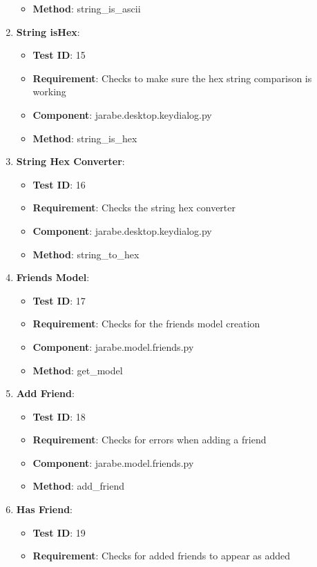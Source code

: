 \documentclass{article}
\begin{document}
\begin{enumerate}[noitemsep,topsep=0pt]
\begin{itemize}[noitemsep,topsep=0pt]
\item \textbf{Method}: string\_is\_ascii
\end{itemize}
\item \textbf{String isHex}:
\begin{itemize}[noitemsep,topsep=0pt]
\item \textbf{Test ID}: 15
\item \textbf{Requirement}: Checks to make sure the hex string comparison is working
\item \textbf{Component}: jarabe.desktop.keydialog.py
\item \textbf{Method}: string\_is\_hex
\end{itemize}
\item \textbf{String Hex Converter}:
\begin{itemize}[noitemsep,topsep=0pt]
\item \textbf{Test ID}: 16
\item \textbf{Requirement}: Checks the string hex converter
\item \textbf{Component}: jarabe.desktop.keydialog.py
\item \textbf{Method}: string\_to\_hex
\end{itemize}
\item \textbf{Friends Model}:
\begin{itemize}[noitemsep,topsep=0pt]
\item \textbf{Test ID}: 17
\item \textbf{Requirement}: Checks for the friends model creation
\item \textbf{Component}: jarabe.model.friends.py
\item \textbf{Method}: get\_model
\end{itemize}
\item \textbf{Add Friend}:
\begin{itemize}[noitemsep,topsep=0pt]
\item \textbf{Test ID}: 18
\item \textbf{Requirement}: Checks for errors when adding a friend
\item \textbf{Component}: jarabe.model.friends.py
\item \textbf{Method}: add\_friend
\end{itemize}
\item \textbf{Has Friend}:
\begin{itemize}[noitemsep,topsep=0pt]
\item \textbf{Test ID}: 19
\item \textbf{Requirement}: Checks for added friends to appear as added

\end{itemize}
\end{enumerate}
\end{document}
